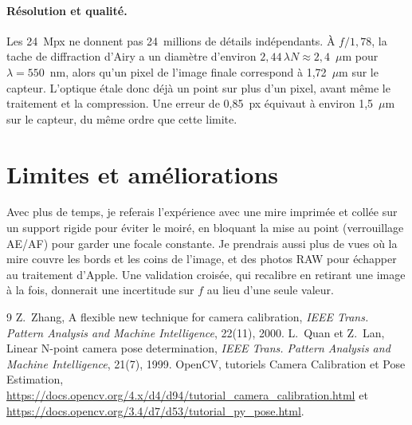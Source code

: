 \documentclass[11pt,a4paper]{article}
\begin{document}
\paragraph{Résolution et qualité.} Les 24~Mpx ne donnent pas 24~millions de détails indépendants. À $f/1{,}78$, la tache de diffraction d'Airy a un diamètre d'environ $2{,}44\,\lambda N \approx 2{,}4$~$\mu$m pour $\lambda=550$~nm, alors qu'un pixel de l'image finale correspond à 1,72~$\mu$m sur le capteur. L'optique étale donc déjà un point sur plus d'un pixel, avant même le traitement et la compression. Une erreur de 0,85~px équivaut à environ 1,5~$\mu$m sur le capteur, du même ordre que cette limite.

\section{Limites et améliorations}

Avec plus de temps, je referais l'expérience avec une mire imprimée et collée sur un support rigide pour éviter le moiré, en bloquant la mise au point (verrouillage AE/AF) pour garder une focale constante. Je prendrais aussi plus de vues où la mire couvre les bords et les coins de l'image, et des photos RAW pour échapper au traitement d'Apple. Une validation croisée, qui recalibre en retirant une image à la fois, donnerait une incertitude sur $f$ au lieu d'une seule valeur.

\begin{thebibliography}{9}
 Z.~Zhang, \og A flexible new technique for camera calibration\fg{}, \emph{IEEE Trans. Pattern Analysis and Machine Intelligence}, 22(11), 2000.
 L.~Quan et Z.~Lan, \og Linear N-point camera pose determination\fg{}, \emph{IEEE Trans. Pattern Analysis and Machine Intelligence}, 21(7), 1999.
 OpenCV, tutoriels \og Camera Calibration\fg{} et \og Pose Estimation\fg{}, \url{https://docs.opencv.org/4.x/d4/d94/tutorial_camera_calibration.html} et \url{https://docs.opencv.org/3.4/d7/d53/tutorial_py_pose.html}.
\end{thebibliography}
\end{document}
